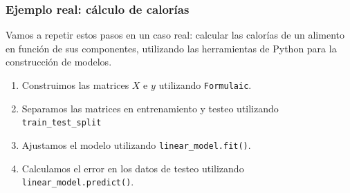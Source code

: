 \documentclass[aspectratio=169,12pt]{beamer}
\begin{document}
\begin{frame}
\frametitle{Ejemplo real: cálculo de calorías}

Vamos a repetir estos pasos en un caso real: calcular las calorías de un alimento en función de sus componentes, utilizando las herramientas de
Python para la construcción de modelos.
\begin{enumerate}
\item Construimos las matrices $X$ e $y$ utilizando \lstinline{Formulaic}.
\item Separamos las matrices en entrenamiento y testeo utilizando \lstinline{train_test_split}
\item Ajustamos el modelo utilizando \lstinline{linear_model.fit()}.
\item Calculamos el error en los datos de testeo utilizando \lstinline{linear_model.predict()}.
\end{enumerate}

\end{frame}
\end{document}
